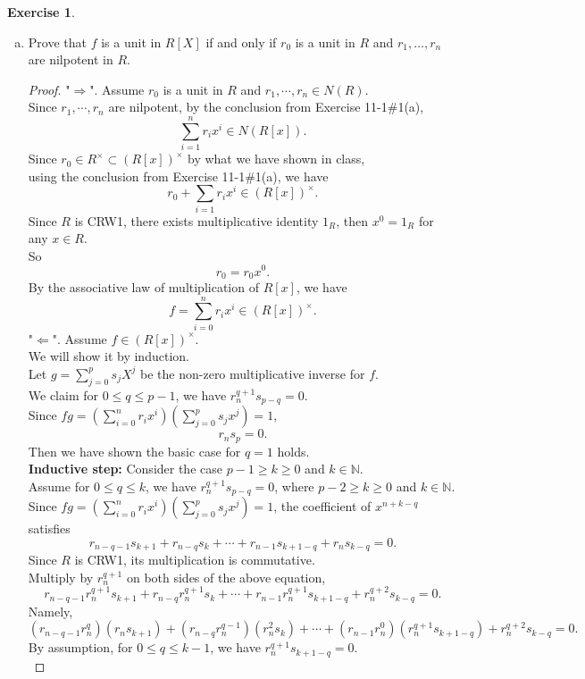 \documentclass{amsart}
\newcommand{\bbn}{\mathbb{N}}
\theoremstyle{plain}
\theoremstyle{definition}
\newtheorem{exer}[lem]{Exercise}
\begin{document}
\begin{exer}
\begin{enumerate}[(a)]
\item Prove that $f$ is a unit in $R[X]$ if and only if $r_0$ is a unit in $R$ and $r_1,\ldots,r_n$ are nilpotent in $R$.
\begin{proof}	
    "$\Rightarrow$". Assume $r_0$ is a unit in $R$ and $r_1,\cdots,r_n \in N(R)$.\\
	Since $r_1,\cdots,r_n$ are nilpotent, by the conclusion from Exercise 11-1$\#$1(a),
	\[\sum_{i=1}^nr_ix^i \in N(R[x]).\]
	Since $r_0 \in R^{\times} \subset (R[x])^{\times}$ by what we have shown in class,\\
	using the conclusion from Exercise 11-1$\#$1(a), we have
	\[r_0 + \sum_{i=1}r_ix^i \in  (R[x])^{\times}.\]
	Since $R$ is CRW1, there exists multiplicative identity $1_R$, then $x^0  = 1_R$ for any $x \in R$.\\
	So 
	\[r_0 = r_0x^0.\]
	By the associative law of multiplication of $R[x]$, we have
	\[f = \sum_{i=0}^nr_ix^i \in  (R[x])^{\times}.\]
	"$\Leftarrow$". Assume $f \in (R[x])^{\times}$.\\
	We will show it by induction.\\
	Let $g = \sum_{j=0}^ps_jX^j$ be the non-zero multiplicative inverse for $f$.\\
	We claim for $0 \leq q  \leq  p-1$, we have $r_n^{q+1}s_{p-q} = 0$.\\
	Since $fg = \left(\sum_{i=0}^nr_ix^i \right) \left(\sum_{j=0}^ps_jx^j \right) = 1$, 
	\[r_ns_p = 0.\]
	Then we have shown the basic case for $q = 1$ holds.\\
	\textbf{Inductive step:} Consider the case $p-1 \geq k \geq 0$ and $k \in \bbn$.\\ 
	Assume for $0 \leq q  \leq  k$, we have $r_n^{q+1}s_{p-q} = 0$, where $ p-2 \geq k \geq 0$ and $k \in \bbn$.\\
	Since $fg = \left(\sum_{i=0}^nr_ix^i \right) \left(\sum_{j=0}^ps_jx^j \right) = 1$, the coefficient of $x^{n+k-q}$ satisfies
	\[r_{n-q-1}s_{k+1} + r_{n-q}s_{k} + \cdots + r_{n-1}s_{k+1-q} + r_ns_{k-q} = 0.\]
	Since $R$ is CRW1, its multiplication is commutative.\\
	Multiply by $r_n^{q+1}$ on both sides of the above equation,
	\[r_{n-q-1}r_n^{q+1}s_{k+1} + r_{n-q}r_n^{q+1}s_{k} + \cdots+ r_{n-1}r_n^{q+1}s_{k+1-q}  + r_n^{q+2}s_{k-q} = 0.\]
	Namely,
	\[\left(r_{n-q-1}r_n^{q}\right)(r_ns_{k+1}) + \left(r_{n-q}r_n^{q-1}\right)(r_n^2s_{k}) + \cdots+ \left(r_{n-1}r_n^{0}\right)(r_{n}^{q+1}s_{k+1-q} ) + r_n^{q+2}s_{k-q} = 0.\]
	By assumption, for $0 \leq q  \leq  k-1$, we have $r_n^{q+1}s_{k+1-q}=0$.\\

\end{proof}
\end{enumerate}
\end{exer}
\end{document}
